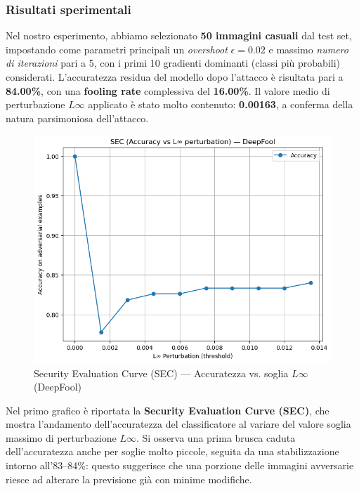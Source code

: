             \subsubsection*{Risultati sperimentali}
                \noindent Nel nostro esperimento, abbiamo selezionato \textbf{50 immagini casuali} dal test set, impostando come parametri principali un \textit{overshoot} $\epsilon = 0.02$ e massimo \textit{numero di iterazioni} pari a 5, con i primi 10 gradienti dominanti (classi più probabili) considerati.
                L’accuratezza residua del modello dopo l’attacco è risultata pari a \textbf{84.00\%}, con una \textbf{fooling rate} complessiva del \textbf{16.00\%}. Il valore medio di perturbazione $L\infty$ applicato è stato molto contenuto: \textbf{0.00163}, a conferma della natura parsimoniosa dell’attacco.
                
                \begin{figure}[H]
                    \centering
                    \includegraphics[width=0.6\linewidth]{images/evaluation_curve_deepfool.png}
                    \caption{Security Evaluation Curve (SEC) --- Accuratezza vs. soglia $L\infty$ (DeepFool)}
                \end{figure}
                
                \noindent Nel primo grafico è riportata la \textbf{Security Evaluation Curve (SEC)}, che mostra l’andamento dell’accuratezza del classificatore al variare del valore soglia massimo di perturbazione $L\infty$. Si osserva una prima brusca caduta dell’accuratezza anche per soglie molto piccole, seguita da una stabilizzazione intorno all’83–84\%: questo suggerisce che una porzione delle immagini avversarie riesce ad alterare la previsione già con minime modifiche.
                
